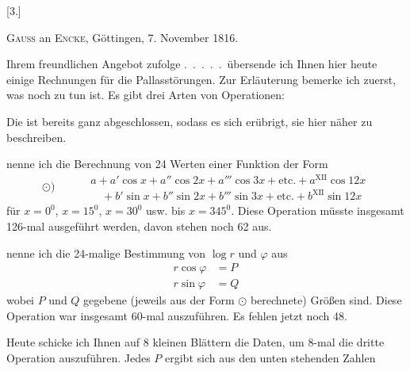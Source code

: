 \begin{landscape}
\begingroup
\fontsize{10}{13}\selectfont
{}
\renewcommand{\headrulewidth}{0pt}
\par\medskip
{}
\begin{center}[3.]\par\medskip
\textsc{Gauss} an \textsc{Encke}, Göttingen, 7. November 1816.
\end{center}
\par\noindent\hspace*{\parindent}Ihrem freundlichen Angebot zufolge .\ .\ .\ .\ .\ übersende ich Ihnen hier
heute einige Rechnungen für die Pallasstörungen. Zur Erläuterung bemerke
ich zuerst, was noch zu tun ist. Es gibt drei Arten von Operationen:
\par\noindent\hspace*{\parindent}Die  ist bereits ganz abgeschlossen, sodass es sich erübrigt,
sie hier näher zu beschreiben.
\par\noindent\hspace*{\parindent} nenne ich die Berechnung von 24 Werten einer
Funktion der Form
\[
\odot)\qquad
\begin{aligned}
&a+a'\cos x+a''\cos2x+a'''\cos3x+\text{etc.}+a^{\mathrm{XII}}\cos12x\\
&\quad+b'\sin x+b''\sin2x+b'''\sin3x+\text{etc.}+b^{\mathrm{XII}}\sin12x
\end{aligned}
\]
\noindent für \(x=0^0\), \(x=15^0\), \(x=30^0\) usw. bis \(x=345^0\). Diese Operation müsste
insgesamt 126-mal ausgeführt werden, davon stehen noch 62 aus.
\par\noindent\hspace*{\parindent} nenne ich die 24-malige Bestimmung von \(\log r\) und \(\varphi\) aus
\[
\begin{aligned}
r\cos\varphi&=P\\
r\sin\varphi&=Q
\end{aligned}
\]
\noindent wobei \(P\) und \(Q\) gegebene (jeweils aus der Form \(\odot\) berechnete) Größen
sind. Diese Operation war insgesamt 60-mal auszuführen. Es fehlen jetzt noch 48.
\par\noindent\hspace*{\parindent}Heute schicke ich Ihnen auf 8 kleinen Blättern die Daten, um 8-mal die dritte
Operation auszuführen. Jedes \(P\) ergibt sich aus den unten stehenden Zahlen

\end{landscape}
